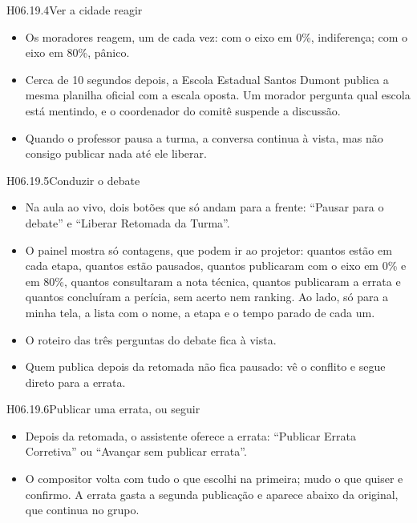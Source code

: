 \begin{historia}{H06.19.4}{Ver a cidade reagir}{\pronto}
\aceite
\begin{itemize}
  \item Os moradores reagem, um de cada vez: com o eixo em 0\%, indiferença;
    com o eixo em 80\%, pânico.
  \item Cerca de 10 segundos depois, a Escola Estadual Santos Dumont publica
    a mesma planilha oficial com a escala oposta. Um morador pergunta qual
    escola está mentindo, e o coordenador do comitê suspende a discussão.
  \item Quando o professor pausa a turma, a conversa continua à vista, mas não
    consigo publicar nada até ele liberar.
\end{itemize}
\end{historia}

\begin{historia}{H06.19.5}{Conduzir o debate}{\pronto}
\aceite
\begin{itemize}
  \item Na aula ao vivo, dois botões que só andam para a frente:
    \enquote{Pausar para o debate} e \enquote{Liberar Retomada da Turma}.
  \item O painel mostra só contagens, que podem ir ao projetor: quantos estão
    em cada etapa, quantos estão pausados, quantos publicaram com o eixo em
    0\% e em 80\%, quantos consultaram a nota técnica, quantos publicaram a
    errata e quantos concluíram a perícia, sem acerto nem ranking. Ao lado,
    só para a minha tela, a lista com o nome, a etapa e o tempo parado de
    cada um.
  \item O roteiro das três perguntas do debate fica à vista.
  \item Quem publica depois da retomada não fica pausado: vê o conflito e
    segue direto para a errata.
\end{itemize}
\end{historia}

\begin{historia}{H06.19.6}{Publicar uma errata, ou seguir}{\pronto}
\aceite
\begin{itemize}
  \item Depois da retomada, o assistente oferece a errata: \enquote{Publicar
    Errata Corretiva} ou \enquote{Avançar sem publicar errata}.
  \item O compositor volta com tudo o que escolhi na primeira; mudo o que
    quiser e confirmo. A errata gasta a segunda publicação e aparece abaixo
    da original, que continua no grupo.
\end{itemize}
\end{historia}

